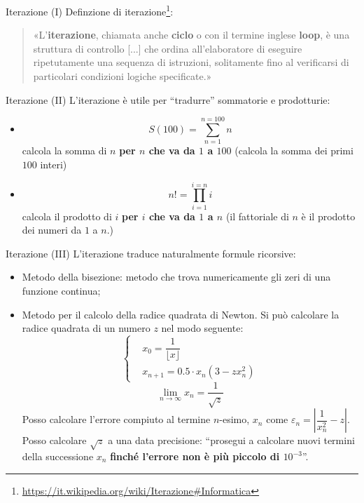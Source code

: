 \begin{frame}{Iterazione (I)}
  Definzione di iterazione\footnote{\url{https://it.wikipedia.org/wiki/Iterazione\#Informatica}}:
  \begin{quote}
    «L'\textbf{iterazione}, chiamata anche \textbf{ciclo} o con il termine inglese \textbf{loop}, 
    è una struttura di controllo [...]  che ordina all'elaboratore di eseguire ripetutamente 
    una sequenza di istruzioni, solitamente fino al verificarsi di particolari condizioni logiche specificate.»
  \end{quote}
\end{frame}

\begin{frame}{Iterazione (II)}
  L'iterazione è utile per ``tradurre'' sommatorie e prodotturie:
  \begin{itemize}
   \item \[S(100) = \sum_{n=1}^{n=100} n\]
	 calcola la somma di $n$ \textbf{per $n$ che va da  $1$ a $100$}
	 (calcola la somma dei primi $100$ interi)
   \item \[n! = \prod_{i=1}^{i=n} i\]
	 calcola il prodotto di $i$ \textbf{per $i$ che va da  $1$ a $n$}
	 (il fattoriale di $n$ \`e il prodotto dei numeri da $1$ a $n$.)
  \end{itemize}

\end{frame}

\begin{frame}{Iterazione (III)}
  L'iterazione traduce naturalmente formule ricorsive:
  \begin{itemize}
    \item Metodo della bisezione: metodo che trova numericamente gli zeri di una funzione continua;

    \item Metodo per il calcolo della radice quadrata di Newton.
    Si può calcolare la radice quadrata di un numero $z$ nel modo seguente:
    \begin{equation*}
      \left\{\begin{aligned}
	  & x_0 = \dfrac{1}{\lfloor x \rfloor} \\
	  & x_{n +1} = 0.5 \cdot {x_n} (3  - zx^2_n)
      \end{aligned}\right.
    \end{equation*}
    \begin{equation*}
     \lim_{n \to \infty} x_{n} = \dfrac{1}{\sqrt{z}}
    \end{equation*}
    Posso calcolare l'errore compiuto al termine $n$-esimo, $x_{n}$ come 
    $\varepsilon_{n} = \left|\dfrac{1}{x^{2}_{n}} - z\right|$.
    Posso calcolare $\sqrt{z}$ a una data precisione: ``prosegui a calcolare nuovi termini della successione $x_{n}$
    \textbf{finché l'errore non è più piccolo di $10^{-3}$}''.


  \end{itemize}

\end{frame}

